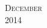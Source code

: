 \documentclass[landscape]{article}
\begin{document}
\newpage

\begin{center}
\textsc{\LARGE December}\\ %
\textsc{\large 2014} %
\end{center}

\begin{calendar}{\hsize}
 




\BlankDay





\end{calendar}
\end{document}
